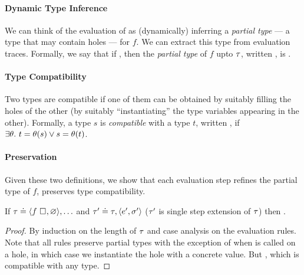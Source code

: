 \paragraph{Dynamic Type Inference}
We can think of the evaluation of  as (dynamically)
inferring a \emph{partial type} --- a type that may contain holes ---
for $f$.
%
We can extract this type from evaluation traces.
%
Formally, we say that if ,
then the \emph{partial type} of $f$ upto $\tau$, written ,
is .
%

\paragraph{Type Compatibility}
Two types are compatible if one of them can be obtained by
suitably filling the holes of the other (\ie by suitably ``instantiating''
the type variables appearing in the other). Formally, a type $s$ is
\emph{compatible} with a type $t$, written , if
$\exists \theta.\ t = \theta(s) \lor s = \theta(t)$.

\paragraph{Preservation}
Given these two definitions, we show that each evaluation step
refines the partial type of $f$, \ie preserves type compatibility.
%
\begin{lem}
\label{lem:refine-partial}
If $\tau \doteq \langle f \ \square_{}, \varnothing \rangle,\ldots$ and
$\tau' \doteq \tau, \langle e', \sigma' \rangle$ (\ie $\tau'$ is single
step extension of $\tau$)
%
%
then .
\end{lem}
\begin{proof}
  By induction on the length of $\tau$ and case analysis on the evaluation rules.
  Note that all rules preserve partial types with the exception of when
  \forcesym is called on a hole, in which case we instantiate the hole with
  a concrete value.
  But \hastype{\ehole{}}{\thole{}}, which is compatible with any type.
\end{proof}

